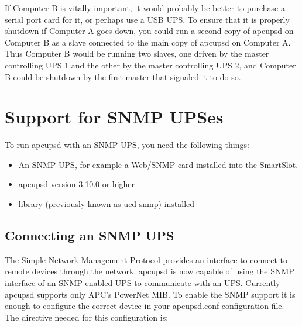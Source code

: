 {{{{{{{{{{If Computer B is vitally important, it would probably be better to purchase a
serial port card for it, or perhaps use a USB UPS. To ensure that it is
properly shutdown if Computer A goes down, you could run a second copy of
apcupsd on Computer B as a slave connected to the main copy of apcupsd on
Computer A. Thus Computer B would be running two slaves, one driven by the
master controlling UPS 1 and the other by the master controlling UPS 2, and
Computer B could be shutdown by the first master that signaled it to do so. 

\label{Support-for-SNMP-UPSes}

\section*{Support for SNMP UPSes}

\label{index-SNMP-162}
 To run apcupsd with an SNMP UPS, you need the
following things:  

\begin{itemize}
\item An SNMP UPS, for example a Web/SNMP card installed into the SmartSlot.  
\item apcupsd version 3.10.0 or higher  
\item 
    library (previously known as
   ucd-snmp) installed 
\end{itemize}

\label{Connecting-an-SNMP-UPS}

\subsection*{Connecting an SNMP UPS}

\label{index-SNMP_002c-Connecting-163}
The Simple Network Management Protocol provides an interface to connect to
remote devices through the network. apcupsd is now capable of using the SNMP
interface of an SNMP-enabled UPS to communicate with an UPS. Currently apcupsd
supports only APC's PowerNet MIB. To enable the SNMP support it is enough to
configure the correct device in your apcupsd.conf configuration file. The
directive needed for this configuration is: 

\footnotesize
\begin{verbatim}
     

\end{verbatim}}}}}}}}}}}

